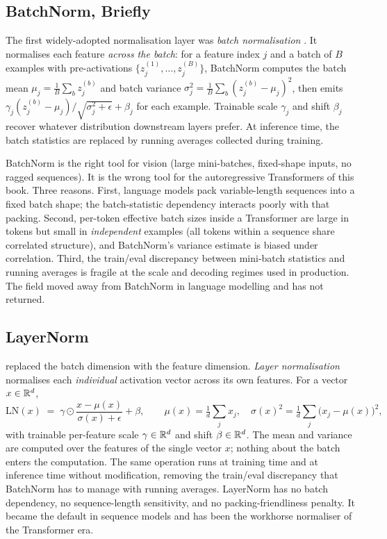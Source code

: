 \subsection{BatchNorm, Briefly}

The first widely-adopted normalisation layer was \emph{batch
normalisation} \citep{ioffe2015batchnorm}. It normalises each
feature \emph{across the batch}: for a feature index $j$ and a
batch of $B$ examples with pre-activations $\{z^{(1)}_j, \dots,
z^{(B)}_j\}$, BatchNorm computes the batch mean
$\mu_j = \tfrac{1}{B}\sum_b z^{(b)}_j$ and batch variance
$\sigma_j^2 = \tfrac{1}{B}\sum_b (z^{(b)}_j - \mu_j)^2$, then
emits $\gamma_j (z^{(b)}_j - \mu_j) / \sqrt{\sigma_j^2 +
\epsilon} + \beta_j$ for each example. Trainable scale $\gamma_j$
and shift $\beta_j$ recover whatever distribution downstream
layers prefer. At inference time, the batch statistics are
replaced by running averages collected during training.

BatchNorm is the right tool for vision (large mini-batches,
fixed-shape inputs, no ragged sequences). It is the wrong tool
for the autoregressive Transformers of this book. Three reasons.
First, language models pack variable-length sequences into a
fixed batch shape; the batch-statistic dependency interacts
poorly with that packing. Second, per-token effective batch
sizes inside a Transformer are large in tokens but small in
\emph{independent} examples (all tokens within a sequence share
correlated structure), and BatchNorm's variance estimate is
biased under correlation. Third, the train/eval discrepancy
between mini-batch statistics and running averages is fragile at
the scale and decoding regimes used in production. The field
moved away from BatchNorm in language modelling and has not
returned.

\subsection{LayerNorm}

\citet{ba2016layernorm} replaced the batch dimension with the
feature dimension. \emph{Layer normalisation} normalises each
\emph{individual} activation vector across its own features.
For a vector $x \in \mathbb{R}^d$,
\begin{equation}
  \mathrm{LN}(x) \;=\; \gamma \odot \frac{x - \mu(x)}{\sigma(x) + \epsilon} + \beta,
  \qquad
  \mu(x) = \tfrac{1}{d}\sum_j x_j,
  \quad
  \sigma(x)^2 = \tfrac{1}{d}\sum_j \bigl(x_j - \mu(x)\bigr)^2,
  \label{eq:nn-layernorm}
\end{equation}
with trainable per-feature scale $\gamma \in \mathbb{R}^d$ and shift
$\beta \in \mathbb{R}^d$. The mean and variance are computed over the
features of the single vector $x$; nothing about the batch enters
the computation. The same operation runs at training time and at
inference time without modification, removing the train/eval
discrepancy that BatchNorm has to manage with running averages.
LayerNorm has no batch dependency, no sequence-length sensitivity,
and no packing-friendliness penalty. It became the default in
sequence models and has been the workhorse normaliser of the
Transformer era.

